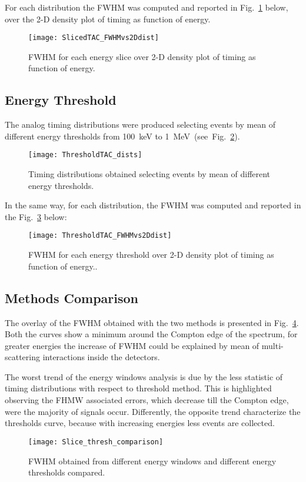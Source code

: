 For each distribution the FWHM was computed and reported in  Fig.~\ref{fig: energy windows analog} below, over the 2-D density plot of timing as function of energy.
\begin{figure}[h!]
	\centering
	\texttt{[image: SlicedTAC\_FWHMvs2Ddist]}
	\caption{FWHM for each energy slice over 2-D density plot of timing as function of energy. }
	\label{fig: energy windows analog}
\end{figure}

\subsection*{Energy Threshold}
 The analog timing distributions were produced selecting events by mean of different energy thresholds from 100~keV to 1~MeV~(see~Fig.~\ref{Fig: lower energy thr}). 

\begin{figure}[h!]
	\centering
	\texttt{[image: ThresholdTAC\_dists]}
	\caption{Timing distributions obtained selecting events by mean of different energy thresholds.}
	\label{Fig: lower energy thr}
\end{figure}

In the same way, for each distribution, the FWHM was computed and reported in the Fig.~\ref{Fig:2Dplot_th} below:

\begin{figure}[h!]
	\centering
	\texttt{[image: ThresholdTAC\_FWHMvs2Ddist]}
	\caption{FWHM for each energy threshold over 2-D density plot of timing as function of energy..}
	\label{Fig:2Dplot_th}
\end{figure}

\subsection*{Methods  Comparison}

The overlay of the FWHM obtained with the two methods is presented in Fig.~\ref{Fig:Slice_th_comp}. Both the curves show a minimum around the Compton edge of the spectrum, for greater energies the increase of FWHM could be explained by mean of multi-scattering interactions inside the detectors. 

The worst trend of the energy windows analysis is due by the less statistic of timing distributions with respect to threshold method. This is highlighted observing the FHMW associated errors, which decrease till the Compton edge, were the majority of signals occur. Differently, the opposite trend characterize the thresholds curve, because with increasing energies less events are collected.
\begin{figure}[H]
	\centering
	\texttt{[image: Slice\_thresh\_comparison]}
	\caption{FWHM obtained from different energy windows and different energy thresholds compared.}
	\label{Fig:Slice_th_comp}
\end{figure}










